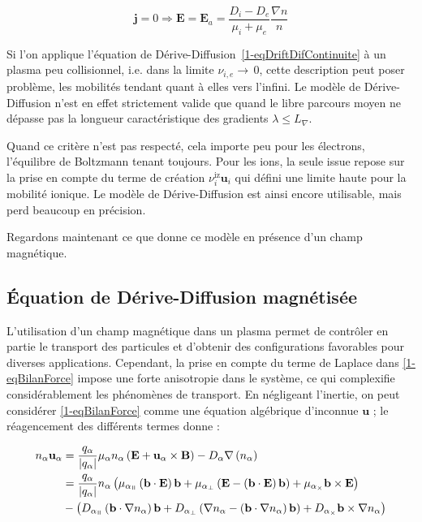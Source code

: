 \begin{refsection}
\begin{equation}
\label{1-eqEAmb}
\mathbf j=0 \Rightarrow \mathbf E=\mathbf
E_a=\frac{D_i-D_e}{\mu_i+\mu_e}\frac{\nabla
n}{n}
\end{equation}

Si l'on applique l'équation de
Dérive-Diffusion~\eqref{1-eqDriftDifContinuite} à un plasma peu collisionnel,
i.e. dans la limite $\nu_{i,e}\rightarrow\,$0, cette description peut poser
problème, les mobilités tendant quant à elles vers l'infini. Le modèle de
Dérive-Diffusion n'est en effet strictement valide que quand le libre parcours
moyen ne dépasse pas la longueur caractéristique des gradients $\lambda\le
L_{\nabla}$.

Quand ce critère n'est pas respecté, cela importe peu pour les
électrons, l'équilibre de
Boltzmann tenant toujours.
Pour les ions, la seule issue repose sur la prise en compte du
terme de création $\nu^\text{iz}_i\mathbf u_i$ qui défini une limite haute pour
la mobilité ionique.
Le modèle de Dérive-Diffusion est ainsi encore utilisable, mais perd beaucoup en
précision.

Regardons maintenant ce que donne ce modèle en présence d'un champ magnétique.

\subsection{Équation de Dérive-Diffusion magnétisée}
\label{1-deriveDiffMag}
L'utilisation d'un champ magnétique dans un plasma permet de contrôler en partie
le transport des particules et d'obtenir des configurations favorables pour
diverses applications. Cependant, la prise en compte du terme de Laplace dans
\eqref{1-eqBilanForce} impose une forte anisotropie dans le système, ce qui
complexifie considérablement les phénomènes de transport. En
négligeant l'inertie, on peut considérer \eqref{1-eqBilanForce} comme une
équation algébrique d'inconnue $\mathbf u$ ; le réagencement des différents
termes donne :

\begin{equation}
\label{2-eqDriftDifMag}
\begin{split}
n_\alpha\mathbf u_\alpha&=\frac{q_\alpha}{|q_\alpha|}\mu_\alpha
n_\alpha\left(\mathbf E+\mathbf u_\alpha\times\mathbf
B\right)-D_\alpha\nabla\left( n_\alpha\right)
\\
&=\frac{q_\alpha}{|q_\alpha|} n_\alpha\left(\mu_{\alpha_\para}\left(\mathbf
b\cdot\mathbf E\right)\mathbf b+\mu_{\alpha_\perp}\left(\mathbf
E-\left(\mathbf
b\cdot\mathbf E\right)\mathbf
b\right)+\mu_{\alpha_\times}\mathbf
b\times\mathbf E\right)
\\
&-\left(D_{\alpha_\para}\left(\mathbf
b\cdot\nabla n_\alpha\right)\mathbf b+D_{\alpha_\perp}\left(\mathbf
\nabla n_\alpha-\left(\mathbf
b\cdot\nabla n_\alpha\right)\mathbf
b\right)+D_{\alpha_\times}\mathbf
b\times\mathbf \nabla n_\alpha\right)
\end{split}
\end{equation}


\end{refsection}
